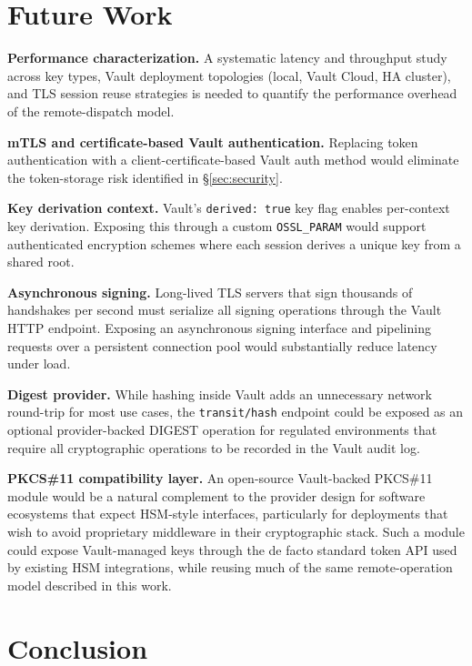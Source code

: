 \documentclass[sigconf,10pt]{acmart}
\begin{document}
\section{Future Work}
\label{sec:future}

\textbf{Performance characterization.}  A systematic latency and throughput
study across key types, Vault deployment topologies (local, Vault Cloud, HA
cluster), and TLS session reuse strategies is needed to quantify the
performance overhead of the remote-dispatch model.

\textbf{mTLS and certificate-based Vault authentication.}  Replacing token
authentication with a client-certificate-based Vault auth method would
eliminate the token-storage risk identified in \S\ref{sec:security}.

\textbf{Key derivation context.}  Vault's \texttt{derived: true} key flag
enables per-context key derivation.  Exposing this through a custom
\texttt{OSSL\_PARAM} would support authenticated encryption schemes where
each session derives a unique key from a shared root.

\textbf{Asynchronous signing.}  Long-lived TLS servers that sign thousands
of handshakes per second must serialize all signing operations through the
Vault HTTP endpoint.  Exposing an asynchronous signing interface and
pipelining requests over a persistent connection pool would substantially
reduce latency under load.

\textbf{Digest provider.}  While hashing inside Vault adds an unnecessary
network round-trip for most use cases, the \texttt{transit/hash} endpoint
could be exposed as an optional provider-backed DIGEST operation for
regulated environments that require all cryptographic operations to be
recorded in the Vault audit log.

\textbf{PKCS\#11 compatibility layer.}  An open-source Vault-backed
PKCS\#11 module would be a natural complement to the provider design for
software ecosystems that expect HSM-style interfaces, particularly for
deployments that wish to avoid proprietary middleware in their cryptographic
stack.  Such a module could expose Vault-managed keys through the de facto
standard token API used by existing HSM integrations, while reusing much of
the same remote-operation model described in this work.

\section{Conclusion}
\label{sec:conclusion}
\end{document}
